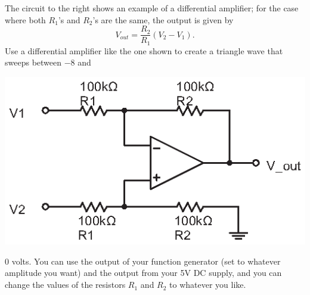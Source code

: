 \begin{enumerate}[wide]
\begin{minipage}{.53\textwidth}
\item The circuit to the right shows an example of a differential amplifier; for the case where both $R_1$'s and $R_2$'s are the same, the output is given by  \label{part_differential}
\begin{equation*}
V_{out} = \frac{R_2}{R_1} \left( V_2 - V_1 \right).
\end{equation*}
Use a differential amplifier like the one shown to create a triangle wave that sweeps between $-8$ and
\end{minipage}
\begin{minipage}{.46\textwidth}
\begin{flushright}
\includegraphics{op-amps/differential_amp.eps}

\vspace*{0.32in}
\end{flushright}
\end{minipage}
0 volts.  You can use the output of your function generator (set to whatever amplitude you want) and the output from your 5V DC supply, and you can change the values of the resistors $R_1$ and $R_2$ to whatever you like.  


\end{enumerate}
